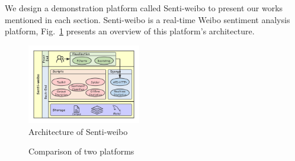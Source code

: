 \documentclass[runningheads]{llncs}
\begin{document}
We design a demonstration platform called Senti-weibo to present our works mentioned in each section. Senti-weibo is a real-time Weibo sentiment analysis platform, Fig.~\ref{fig:Senti-weibo} presents an overview of this platform's architecture.

\begin{figure}[htp]
\begin{center}
\includegraphics[width=0.44\textwidth]{images/Architecture-of-Senti-weibo-3.png}
\caption{Architecture of Senti-weibo}
\label{fig:Senti-weibo}
\end{center}
\end{figure}

\begin{figure}[ht]
\centering  %
\caption{Comparison of two platforms}
\label{fig:topic-trend-of-huawei}
\end{figure}
\end{document}
